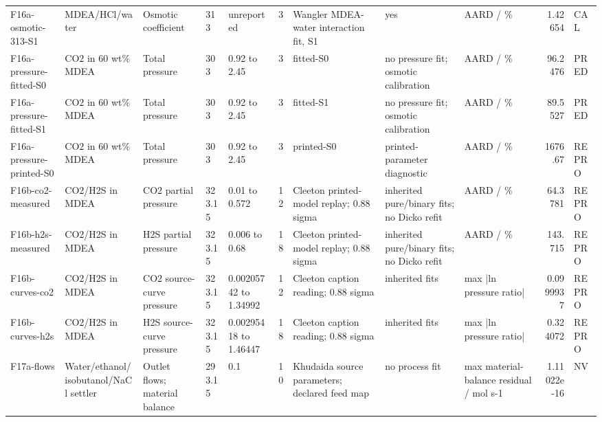 \begin{landscape}
\begin{longtable}{L{1.9cm}L{2.5cm}L{2.1cm}L{1.6cm}L{1.6cm}rL{2.4cm}L{1.9cm}L{2.2cm}rL{1cm}}
F16a-\allowbreak{}osmotic-\allowbreak{}313-\allowbreak{}S1 & MDEA/\allowbreak{}HCl/\allowbreak{}water & Osmotic coefficient & 313 & unreported & 3 & Wangler MDEA-\allowbreak{}water interaction fit, S1 & yes & AARD /\allowbreak{} \% & 1.42654 & CAL \\
F16a-\allowbreak{}pressure-\allowbreak{}fitted-\allowbreak{}S0 & CO2 in 60 wt\% MDEA & Total pressure & 303 & 0.92 to 2.45 & 3 & fitted-\allowbreak{}S0 & no pressure fit; osmotic calibration & AARD /\allowbreak{} \% & 96.2476 & PRED \\
F16a-\allowbreak{}pressure-\allowbreak{}fitted-\allowbreak{}S1 & CO2 in 60 wt\% MDEA & Total pressure & 303 & 0.92 to 2.45 & 3 & fitted-\allowbreak{}S1 & no pressure fit; osmotic calibration & AARD /\allowbreak{} \% & 89.5527 & PRED \\
F16a-\allowbreak{}pressure-\allowbreak{}printed-\allowbreak{}S0 & CO2 in 60 wt\% MDEA & Total pressure & 303 & 0.92 to 2.45 & 3 & printed-\allowbreak{}S0 & printed-\allowbreak{}parameter diagnostic & AARD /\allowbreak{} \% & 1676.67 & REPRO \\
F16b-\allowbreak{}co2-\allowbreak{}measured & CO2/\allowbreak{}H2S in MDEA & CO2 partial pressure & 323.15 & 0.01 to 0.572 & 12 & Cleeton printed-\allowbreak{}model replay; 0.88 sigma & inherited pure/\allowbreak{}binary fits; no Dicko refit & AARD /\allowbreak{} \% & 64.3781 & REPRO \\
F16b-\allowbreak{}h2s-\allowbreak{}measured & CO2/\allowbreak{}H2S in MDEA & H2S partial pressure & 323.15 & 0.006 to 0.68 & 18 & Cleeton printed-\allowbreak{}model replay; 0.88 sigma & inherited pure/\allowbreak{}binary fits; no Dicko refit & AARD /\allowbreak{} \% & 143.715 & REPRO \\
F16b-\allowbreak{}curves-\allowbreak{}co2 & CO2/\allowbreak{}H2S in MDEA & CO2 source-\allowbreak{}curve pressure & 323.15 & 0.00205742 to 1.34992 & 12 & Cleeton caption reading; 0.88 sigma & inherited fits & max |ln pressure ratio| & 0.0999937 & REPRO \\
F16b-\allowbreak{}curves-\allowbreak{}h2s & CO2/\allowbreak{}H2S in MDEA & H2S source-\allowbreak{}curve pressure & 323.15 & 0.00295418 to 1.46447 & 18 & Cleeton caption reading; 0.88 sigma & inherited fits & max |ln pressure ratio| & 0.324072 & REPRO \\
F17a-\allowbreak{}flows & Water/\allowbreak{}ethanol/\allowbreak{}isobutanol/\allowbreak{}NaCl settler & Outlet flows; material balance & 293.15 & 0.1 & 10 & Khudaida source parameters; declared feed map & no process fit & max material-\allowbreak{}balance residual /\allowbreak{} mol s-\allowbreak{}1 & 1.11022e-\allowbreak{}16 & NV \\

\end{longtable}
\end{landscape}
